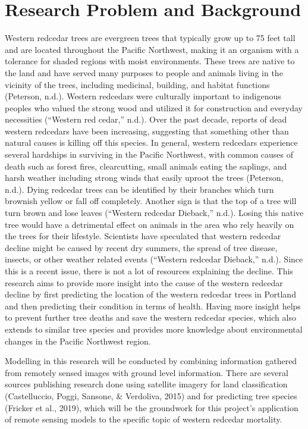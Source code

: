 \documentclass[12pt,twoside]{reedthesis}
\begin{document}
\clearpage

\hypertarget{research-problem-and-background}{%
\section{Research Problem and Background}\label{research-problem-and-background}}

Western redcedar trees are evergreen trees that typically grow up to 75 feet tall and are located throughout the Pacific Northwest, making it an organism with a tolerance for shaded regions with moist environments. These trees are native to the land and have served many purposes to people and animals living in the vicinity of the trees, including medicinal, building, and habitat functions (Peterson, n.d.). Western redcedars were culturally important to indigenous peoples who valued the strong wood and utilized it for construction and everyday necessities (``Western red cedar,'' n.d.). Over the past decade, reports of dead western redcedars have been increasing, suggesting that something other than natural causes is killing off this species. In general, western redcedars experience several hardships in surviving in the Pacific Northwest, with common causes of death such as forest fires, clearcutting, small animals eating the saplings, and harsh weather including strong winds that easily uproot the trees (Peterson, n.d.). Dying redcedar trees can be identified by their branches which turn brownish yellow or fall off completely. Another sign is that the top of a tree will turn brown and lose leaves (``Western redcedar Dieback,'' n.d.). Losing this native tree would have a detrimental effect on animals in the area who rely heavily on the trees for their lifestyle. Scientists have speculated that western redcedar decline might be caused by recent dry summers, the spread of tree disease, insects, or other weather related events (``Western redcedar Dieback,'' n.d.). Since this is a recent issue, there is not a lot of resources explaining the decline. This research aims to provide more insight into the cause of the western redcedar decline by first predicting the location of the western redcedar trees in Portland and then predicting their condition in terms of health. Having more insight helps to prevent further tree deaths and save the western redcedar species, which also extends to similar tree species and provides more knowledge about environmental changes in the Pacific Northwest region.

Modelling in this research will be conducted by combining information gathered from remotely sensed images with ground level information. There are several sources publishing research done using satellite imagery for land classification (Castelluccio, Poggi, Sansone, \& Verdoliva, 2015) and for predicting tree species (Fricker et al., 2019), which will be the groundwork for this project's application of remote sensing models to the specific topic of western redcedar mortality.
\end{document}
